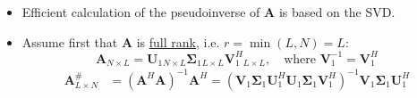 \begin{itemize}
\begin{align*}
\mathbf{A}_{N \times L} 
&= \mathbf{U}_{N \times N} \mathbf{\Sigma}_{N \times L} \mathbf{V}^{H}_{L \times L} \\[1em]
&= 
\begin{bmatrix}\mathbf{U}_1 & \mathbf{U}_2\end{bmatrix}
\begin{bmatrix}\mathbf{\Sigma}_1 & 0 \\ 0 & 0\end{bmatrix}
\begin{bmatrix}\mathbf{V}_1 & \mathbf{V}_2\end{bmatrix}^{H} \\[1em]
&= 
\begin{bmatrix}\mathbf{U}_1 & \mathbf{U}_2\end{bmatrix}
\begin{bmatrix}\mathbf{\Sigma}_1 & 0 \\ 0 & 0\end{bmatrix}
\begin{bmatrix}\mathbf{V}_1^{H} \\ \mathbf{V}_2^{H}\end{bmatrix} \\[1em]
&= 
\begin{bmatrix}\mathbf{U}_1 \mathbf{\Sigma}_1 & 0\end{bmatrix}
\begin{bmatrix}\mathbf{V}_1^{H} \\ \mathbf{V}_2^{H}\end{bmatrix} \\[1em]
&= \mathbf{U}_1 \mathbf{\Sigma}_1 \mathbf{V}_1^{H}{}_{N \times r ~ r \times r ~ r \times L}
\end{align*}
\[
\mathbf{A}_{N \times L}
= \mathbf{U}_{N \times N} \mathbf{\Sigma}_{N \times L} \mathbf{V}^{H}_{L \times L}
= \mathbf{U}_1{}_{N \times r} \;\mathbf{\Sigma}_1{}_{r \times r}\; \mathbf{V}_1^{H}{}_{r \times L}
\]
    \item Efficient calculation of the pseudoinverse of \textbf{A} is based on the SVD.
    \item Assume first that \textbf{A} is \underline{full rank}, i.e. \(r=\min(L,N)=L\):
    \[
\mathbf{A}_{N \times L}
= \mathbf{U}_1{}_{N \times L}
\mathbf{\Sigma}_1{}_{L \times L}
\mathbf{V}_1^{H}{}_{L \times L}
,\quad
\text{where } \mathbf{V}_1^{-1} = \mathbf{V}_1^{H}
\]
\vspace{-0.5em}
\begin{align*}
\mathbf{A}^{\#}_{L \times N}
&= (\mathbf{A}^{H}\mathbf{A})^{-1} \mathbf{A}^{H} = \left(\mathbf{V}_1 \mathbf{\Sigma}_1 \mathbf{U}_1^{H} \mathbf{U}_1 \mathbf{\Sigma}_1 \mathbf{V}_1^{H}\right)^{-1} \mathbf{V}_1 \mathbf{\Sigma}_1 \mathbf{U}_1^{H} \\

\end{align*}
\end{itemize}
